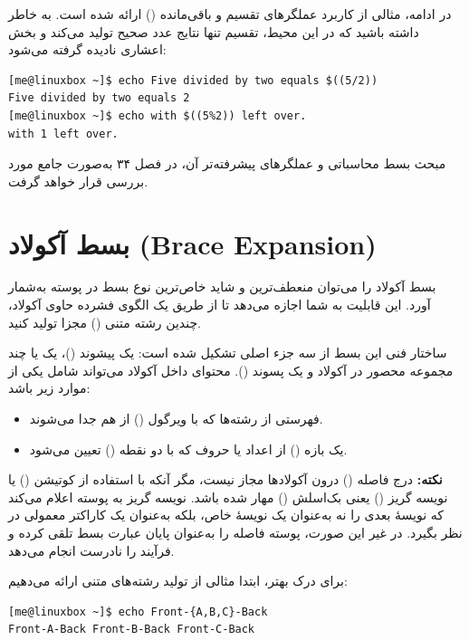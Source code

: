 در ادامه، مثالی از کاربرد عملگرهای تقسیم و باقی‌مانده () ارائه شده است. به خاطر داشته باشید که در این محیط، تقسیم تنها نتایج عدد صحیح تولید می‌کند و بخش اعشاری نادیده گرفته می‌شود:

\begin{latin}
\begin{lstlisting}
[me@linuxbox ~]$ echo Five divided by two equals $((5/2))
Five divided by two equals 2
[me@linuxbox ~]$ echo with $((5%2)) left over.
with 1 left over.
\end{lstlisting}
\end{latin}

مبحث بسط محاسباتی و عملگرهای پیشرفته‌تر آن، در فصل ۳۴ به‌صورت جامع مورد بررسی قرار خواهد گرفت.

\section{بسط آکولاد (Brace Expansion)}

بسط آکولاد را می‌توان منعطف‌ترین و شاید خاص‌ترین نوع بسط در پوسته به‌شمار آورد. این قابلیت به شما اجازه می‌دهد تا از طریق یک الگوی فشرده حاوی آکولاد، چندین رشته متنی () مجزا تولید کنید.

ساختار فنی این بسط از سه جزء اصلی تشکیل شده است: یک پیشوند ()، یک یا چند مجموعه محصور در آکولاد و یک پسوند (). محتوای داخل آکولاد می‌تواند شامل یکی از موارد زیر باشد:

\begin{itemize}
  \item فهرستی از رشته‌ها که با ویرگول (\cmd{,}) از هم جدا می‌شوند.
  \item یک بازه () از اعداد یا حروف که با دو نقطه () تعیین می‌شود.
\end{itemize}

\begin{note}
\textbf{نکته:} درج فاصله () درون آکولادها مجاز نیست، مگر آنکه با استفاده از کوتیشن () یا نویسه گریز () یعنی بک‌اسلش (\cmd{\textbackslash}) مهار شده باشد. نویسه گریز به پوسته اعلام می‌کند که نویسهٔ بعدی را نه به‌عنوان یک نویسهٔ خاص، بلکه به‌عنوان یک کاراکتر معمولی در نظر بگیرد. در غیر این صورت، پوسته فاصله را به‌عنوان پایان عبارت بسط تلقی کرده و فرآیند را نادرست انجام می‌دهد.
\end{note}

برای درک بهتر، ابتدا مثالی از تولید رشته‌های متنی ارائه می‌دهیم:

\begin{latin}
\begin{lstlisting}
[me@linuxbox ~]$ echo Front-{A,B,C}-Back
Front-A-Back Front-B-Back Front-C-Back
\end{lstlisting}
\end{latin}

